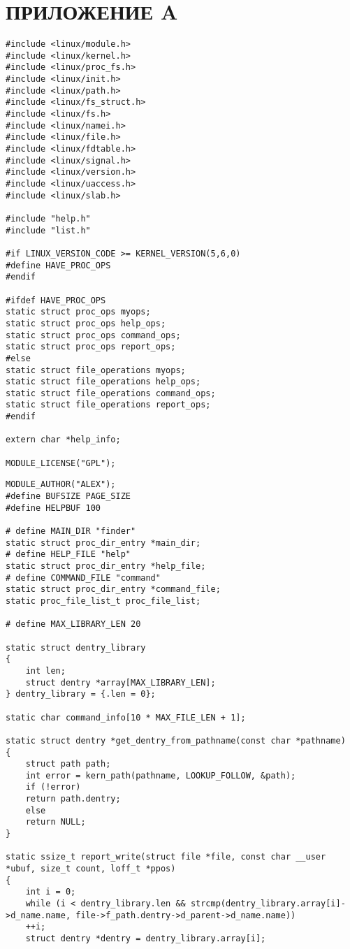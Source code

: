 \chapter*{ПРИЛОЖЕНИЕ A}

\begin{center}
	\begin{lstlisting}[label=listing_main_c1,caption=Файл main.c]
#include <linux/module.h>
#include <linux/kernel.h>
#include <linux/proc_fs.h>
#include <linux/init.h>
#include <linux/path.h>
#include <linux/fs_struct.h>
#include <linux/fs.h>
#include <linux/namei.h>
#include <linux/file.h>
#include <linux/fdtable.h>
#include <linux/signal.h>
#include <linux/version.h>
#include <linux/uaccess.h>
#include <linux/slab.h>

#include "help.h"
#include "list.h"

#if LINUX_VERSION_CODE >= KERNEL_VERSION(5,6,0)
#define HAVE_PROC_OPS
#endif

#ifdef HAVE_PROC_OPS
static struct proc_ops myops;
static struct proc_ops help_ops;
static struct proc_ops command_ops;
static struct proc_ops report_ops;
#else
static struct file_operations myops;
static struct file_operations help_ops;
static struct file_operations command_ops;
static struct file_operations report_ops;
#endif

extern char *help_info;

MODULE_LICENSE("GPL");
	\end{lstlisting}
\end{center}

\begin{center}
	\begin{lstlisting}[label=listing_main_c2,caption=Файл main.c]
MODULE_AUTHOR("ALEX");
#define BUFSIZE PAGE_SIZE
#define HELPBUF 100

# define MAIN_DIR "finder"
static struct proc_dir_entry *main_dir;
# define HELP_FILE "help"
static struct proc_dir_entry *help_file;
# define COMMAND_FILE "command"
static struct proc_dir_entry *command_file;
static proc_file_list_t proc_file_list;

# define MAX_LIBRARY_LEN 20

static struct dentry_library
{
	int len;
	struct dentry *array[MAX_LIBRARY_LEN];
} dentry_library = {.len = 0};

static char command_info[10 * MAX_FILE_LEN + 1];

static struct dentry *get_dentry_from_pathname(const char *pathname) 
{
	struct path path;
	int error = kern_path(pathname, LOOKUP_FOLLOW, &path);
	if (!error)
	return path.dentry;
	else
	return NULL;
}

static ssize_t report_write(struct file *file, const char __user *ubuf, size_t count, loff_t *ppos)
{
	int i = 0;
	while (i < dentry_library.len && strcmp(dentry_library.array[i]->d_name.name, file->f_path.dentry->d_parent->d_name.name))
	++i;
	struct dentry *dentry = dentry_library.array[i];
	\end{lstlisting}
\end{center}

